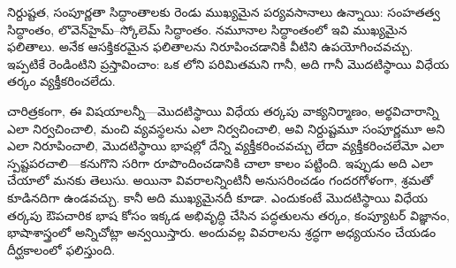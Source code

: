 \documentclass[../../../include/open-logic-section]{subfiles}
\begin{document}
నిర్దుష్టత, సంపూర్ణతా సిద్ధాంతాలకు రెండు ముఖ్యమైన పర్యవసానాలు ఉన్నాయి:
సంహతత్వ సిద్ధాంతం, లొవెన్‌హైమ్--స్కోలెమ్ సిద్ధాంతం. నమూనాల
సిద్ధాంతంలో ఇవి ముఖ్యమైన ఫలితాలు. అనేక ఆసక్తికరమైన ఫలితాలను
నిరూపించడానికి వీటిని ఉపయోగించవచ్చు. ఇప్పటికే రెండింటిని
ప్రస్తావించాం: ఒక లోని  పరిమితమని గానీ,
అది  గానీ మొదటిస్థాయి విధేయ తర్కం వ్యక్తీకరించలేదు.

చారిత్రకంగా, ఈ విషయాలన్నీ---మొదటిస్థాయి విధేయ తర్కపు వాక్యనిర్మాణం,
అర్థవిచారాన్ని ఎలా నిర్వచించాలి, మంచి  వ్యవస్థలను ఎలా
నిర్వచించాలి, అవి నిర్దుష్టమూ సంపూర్ణమూ అని ఎలా నిరూపించాలి,
మొదటిస్థాయి భాషల్లో దేన్ని వ్యక్తీకరించవచ్చు లేదా వ్యక్తీకరించలేమో ఎలా
స్పష్టపరచాలి---కనుగొని సరిగా రూపొందించడానికి చాలా కాలం పట్టింది.
ఇప్పుడు అది ఎలా చేయాలో మనకు తెలుసు. అయినా వివరాలన్నింటినీ
అనుసరించడం గందరగోళంగా, శ్రమతో కూడినదిగా ఉండవచ్చు. కానీ అది
ముఖ్యమైనదీ కూడా. ఎందుకంటే మొదటిస్థాయి విధేయ తర్కపు ఔపచారిక భాష కోసం ఇక్కడ
అభివృద్ధి చేసిన పద్ధతులను తర్కం, కంప్యూటర్ విజ్ఞానం, భాషాశాస్త్రంలో
అన్నిచోట్లా అన్వయిస్తారు. అందువల్ల వివరాలను శ్రద్ధగా అధ్యయనం చేయడం
దీర్ఘకాలంలో ఫలిస్తుంది.
\end{document}
